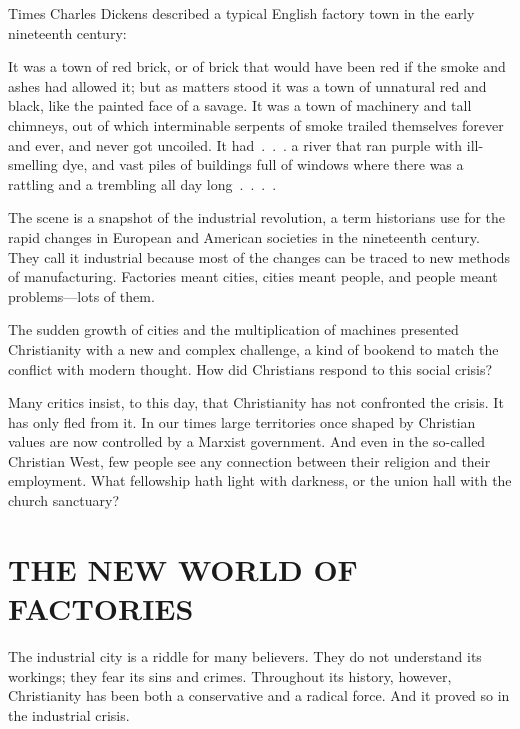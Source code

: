 
 Times Charles Dickens described a typical English factory town in the
early nineteenth century:

\begin{blockquote}
It was a town of red brick, or of brick that would have been red if the smoke and ashes had allowed
it; but as matters stood it was a town of unnatural red and black, like the painted face of a
savage. It was a town of machinery and tall chimneys, out of which interminable serpents of smoke
trailed themselves forever and ever, and never got uncoiled. It had~.~.~. a river that ran purple
with ill-smelling dye, and vast piles of buildings full of windows where there was a rattling and a
trembling all day long~.~.~.~.
\end{blockquote}

The scene is a snapshot of the industrial revolution, a term historians use for the rapid changes in
European and American societies in the nineteenth century. They call it industrial because most of
the changes can be traced to new methods of manufacturing. Factories meant cities, cities meant
people, and people meant problems—lots of them.

The sudden growth of cities and the multiplication of machines presented Christianity with a new and
complex challenge, a kind of bookend to match the conflict with modern thought. How did Christians
respond to this social crisis?

Many critics insist, to this day, that Christianity has not confronted the crisis. It has only fled
from it. In our times large territories once shaped by Christian values are now controlled by a
Marxist government. And even in the so-called Christian West, few people see any connection between
their religion and their employment. What fellowship hath light with darkness, or the union hall
with the church sanctuary?

\section{THE NEW WORLD OF FACTORIES}

The industrial city is a riddle for many believers. They do not understand its workings; they fear
its sins and crimes. Throughout its history, however, Christianity has been both a conservative and
a radical force. And it proved so in the industrial crisis.

